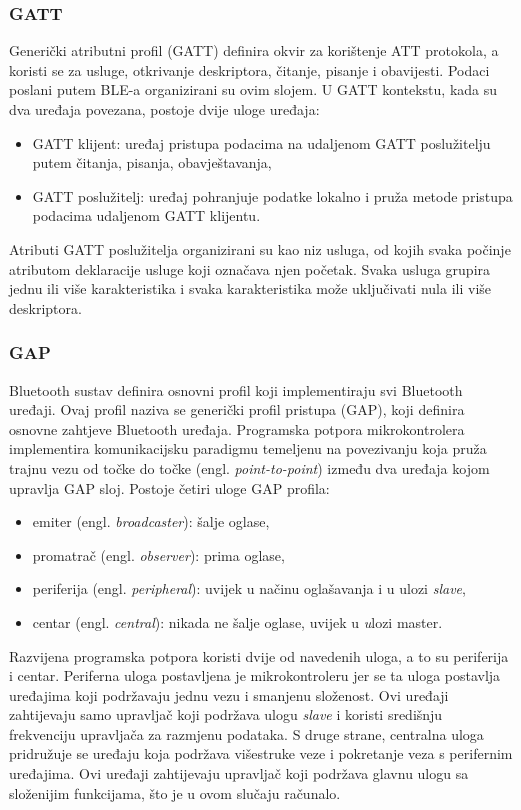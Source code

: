 \subsubsection{GATT}
Generički atributni profil (GATT) definira okvir za korištenje ATT protokola, a koristi se za usluge, otkrivanje deskriptora, čitanje, pisanje i obavijesti. Podaci poslani putem BLE-a organizirani su ovim slojem.
U GATT kontekstu, kada su dva uređaja povezana, postoje dvije uloge uređaja:
\begin{itemize}
	\item GATT klijent: uređaj pristupa podacima na udaljenom GATT poslužitelju putem čitanja, pisanja, obavještavanja,
	\item  GATT poslužitelj: uređaj pohranjuje podatke lokalno i pruža metode pristupa podacima udaljenom GATT klijentu.
\end{itemize}

Atributi GATT poslužitelja organizirani su kao niz usluga, od kojih svaka počinje atributom deklaracije usluge koji označava njen početak. Svaka usluga grupira jednu ili više karakteristika i svaka karakteristika može uključivati nula ili više deskriptora.

\subsubsection{GAP}
Bluetooth sustav definira osnovni profil koji implementiraju svi Bluetooth uređaji. Ovaj profil naziva se generički profil pristupa (GAP), koji definira osnovne zahtjeve Bluetooth uređaja. Programska potpora mikrokontrolera implementira komunikacijsku paradigmu temeljenu na povezivanju koja pruža trajnu vezu od točke do točke (engl. \textit{point-to-point}) između dva uređaja kojom upravlja GAP sloj. Postoje četiri uloge GAP profila:
\begin{itemize}
	\item emiter (engl. \textit{broadcaster}): šalje oglase,
	\item promatrač (engl. \textit{observer}): prima oglase,
	\item periferija (engl. \textit{peripheral}): uvijek u načinu oglašavanja i u ulozi \textit{slave}, 
	\item centar (engl. \textit{central}): nikada ne šalje oglase, uvijek u \textit ulozi {master}.
\end{itemize}

Razvijena programska potpora koristi dvije od navedenih uloga, a to su periferija i centar. Periferna uloga postavljena je mikrokontroleru jer se ta uloga postavlja uređajima koji podržavaju jednu vezu i smanjenu složenost. Ovi uređaji zahtijevaju samo upravljač koji podržava ulogu \textit{slave} i koristi središnju frekvenciju upravljača za razmjenu podataka. S druge strane, centralna uloga pridružuje se uređaju koja podržava višestruke veze i pokretanje veza s perifernim uređajima. Ovi uređaji zahtijevaju upravljač koji podržava glavnu ulogu sa složenijim funkcijama, što je u ovom slučaju računalo.

